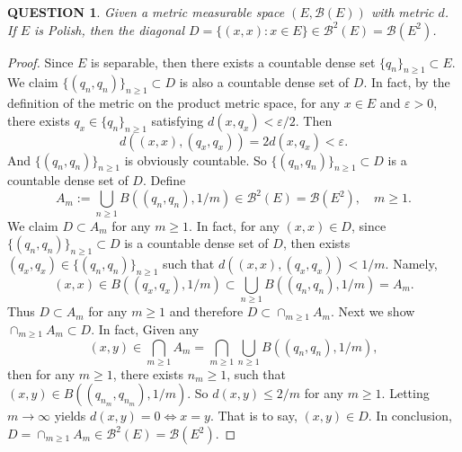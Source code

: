 \documentclass[12pt]{article}
\renewcommand{\b}{\mathscr{B}}
\renewcommand{\(}{\left(}%
\renewcommand{\)}{\right)}%
\renewcommand{\[}{\left[}%
\renewcommand{\]}{\right]}%
\newtheorem{question}{QUESTION}[section]}
\newtheorem{proof}{Proof.}}
\begin{document}
   \begin{question}
   	Given a metric measurable space $(E,\b(E))$ with metric $d$. If $E$ is Polish, then the diagonal $D=\{(x,x):x\in E\}\in \b^2(E)=\b(E^2)$.
   \end{question}
   \begin{proof}
   	Since $E$ is separable, then there exists a countable dense set $\{q_n\}_{n\geq 1}\subset E$. We claim $\{(q_n,q_n)\}_{n\geq 1}\subset D$ is also a countable dense set of $D$. In fact, by the definition of the metric on the product metric space, for any $x\in E$ and $\varepsilon>0$, there exists $q_x\in \{q_n\}_{n\geq 1}$ satisfying $d(x,q_x)<\varepsilon/2$. Then
   	\begin{equation*}
   		d((x,x),(q_x,q_x))=2d(x,q_x)<\varepsilon.
   	\end{equation*}
   	And $\{(q_n,q_n)\}_{n\geq 1}$ is obviously countable. So $\{(q_n,q_n)\}_{n\geq 1}\subset D$ is a countable dense set of $D$. Define
   	\begin{equation*}
   		A_m:=\bigcup_{n\geq 1}B((q_n,q_n),1/m)\in \b^2(E)=\b(E^2),\quad m\geq 1.
   	\end{equation*}
   	We claim $D\subset A_m$ for any $m\geq 1$. In fact, for any $(x,x)\in D$, since $\{(q_n,q_n)\}_{n\geq 1}\subset D$ is a countable dense set of $D$, then exists $(q_x,q_x)\in \{(q_n,q_n)\}_{n\geq 1}$ such that $d((x,x),(q_x,q_x))<1/m$. Namely, 
   	\begin{equation*}
   		(x,x)\in B((q_x,q_x),1/m)\subset \bigcup_{n\geq 1}B((q_n,q_n),1/m)=A_m.
   	\end{equation*}
   	Thus $D\subset A_m$ for any $m\geq 1$ and therefore $D\subset \cap_{m\geq 1}A_m$. Next we show $\cap_{m\geq 1}A_m\subset D$. In fact, Given any 
   	\begin{equation*}
   		(x,y)\in \bigcap_{m\geq 1}A_m=\bigcap_{m\geq 1}\bigcup_{n\geq 1}B((q_n,q_n),1/m),
   	\end{equation*}
   	then for any $m\geq 1$, there exists $n_m\geq 1$, such that $(x,y)\in B((q_{n_m},q_{n_m}),1/m)$. So $d(x,y)\leq 2/m$ for any $m\geq 1$. Letting $m\to\infty$ yields $d(x,y)=0\Leftrightarrow x=y$. That is to say, $(x,y)\in D$. In conclusion, $D=\cap_{m\geq 1}A_m\in \b^2(E)=\b(E^2)$.
   \end{proof}
  
\end{document}
